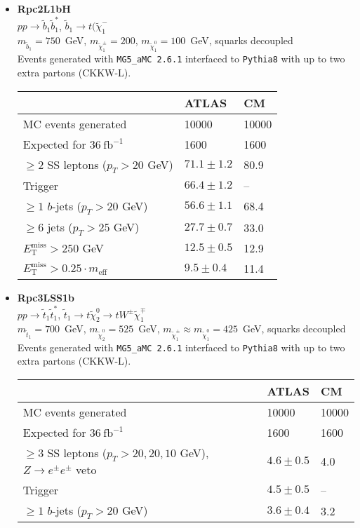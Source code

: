 \documentclass[10pt,fleqn]{article}
\newcommand{\met}{E^\mathrm{miss}_\mathrm{T}}
\newcommand{\meff}{m_\mathrm{eff}}
\begin{document}
\begin{itemize}
\item \textbf{Rpc2L1bH}\\ $ p p \to \tilde{b}_1 \tilde{b}_1^* $, $\tilde{b}_1 \to t (\tilde{\chi}^-_1$\\
 $m_{\tilde{b}_1} = 750$~GeV, $m_{\tilde{\chi}_1^\pm} = 200$, $  m_{\tilde{\chi}_1^0} = 100$~GeV, squarks decoupled\\
 Events generated with \texttt{MG5\_aMC 2.6.1} interfaced to \texttt{Pythia8} with up to two extra partons (CKKW-L).
 \begin{tabular}{l|p{3cm}|p{3cm}} \toprule
                                           &  ATLAS           & CM  \\ \midrule
 MC events generated                       &  10000          & 10000 \\ \midrule
 Expected for $36\ \mathrm{fb}^{-1}$       &  1600           & 1600  \\
 $\geq 2$ SS leptons ($p_T > 20$ GeV)      & $71.1\pm 1.2$   &  80.9 \\
 Trigger                                   & $66.4 \pm 1.2$   &  --\\
 $\geq 1$ $b$-jets ($p_T > 20$ GeV)         & $56.6 \pm 1.1$   &  68.4\\
 $\geq 6$ jets ($p_T > 25$ GeV)            & $27.7 \pm 0.7$   &  33.0\\
 $\met  > 250$ GeV                         & $12.5 \pm 0.5$   &  12.9\\
 $\met > 0.25 \cdot \meff$                 & $9.5 \pm 0.4$   &   11.4\\   \bottomrule 
 \end{tabular}      
 
\item \textbf{Rpc3LSS1b}\\ $ p p \to \tilde{t}_1 \tilde{t}_1^* $, $\tilde{t}_1 \to t \tilde{\chi}^0_2 \to tW^\pm\tilde{\chi}^\mp_1$\\
 $m_{\tilde{t}_1} = 700$~GeV, $m_{\tilde{\chi}_2^0} = 525$~GeV, $m_{\tilde{\chi}_1^\pm} \approx  m_{\tilde{\chi}_1^0} = 425$~GeV, squarks decoupled\\
 Events generated with \texttt{MG5\_aMC 2.6.1} interfaced to \texttt{Pythia8} with up to two extra partons (CKKW-L).
 \begin{tabular}{l|p{3cm}|p{3cm}} \toprule
                                           &  ATLAS           & CM  \\ \midrule
 MC events generated                       &  10000          & 10000 \\ \midrule
 Expected for $36\ \mathrm{fb}^{-1}$       &  1600           & 1600  \\
 $\geq 3$ SS leptons ($p_T > 20, 20, 10$ GeV), $Z\to e^\pm e^\pm$ veto      & $4.6\pm 0.5$   &  4.0 \\
 Trigger                                   & $4.5 \pm 0.5$   &  --\\
 $\geq 1$ $b$-jets ($p_T > 20$ GeV)         & $3.6 \pm 0.4$   &  3.2\\  \bottomrule 
 \end{tabular}      
  

\end{itemize}
\end{document}
